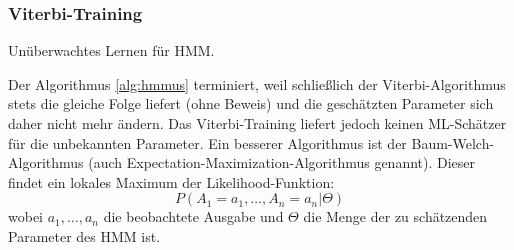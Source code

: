\subsubsection{Viterbi-Training}
\begin{algorithm}
	\begin{algorithmic}[1]
		\Repeat
	\end{algorithmic}
	\caption{Unüberwachtes Lernen für HMM.}
	\label{alg:hmmus}
\end{algorithm}
Der Algorithmus \ref{alg:hmmus} terminiert, weil schließlich der Viterbi-Algorithmus stets die gleiche Folge liefert (ohne Beweis) und die geschätzten Parameter sich daher nicht mehr ändern.
Das Viterbi-Training liefert jedoch keinen ML-Schätzer für die unbekannten Parameter.
Ein besserer Algorithmus ist der Baum-Welch-Algorithmus (auch Ex\-pect\-ation-Maximization-Algorithmus genannt).
Dieser findet ein lokales Maximum der Likelihood-Funktion:
	\[P(A_1=a_1, \dots, A_n=a_n|\Theta)\]
wobei \(a_1, \dots, a_n\) die beobachtete Ausgabe und \(\Theta\) die Menge der zu schätzenden Parameter des HMM ist.

